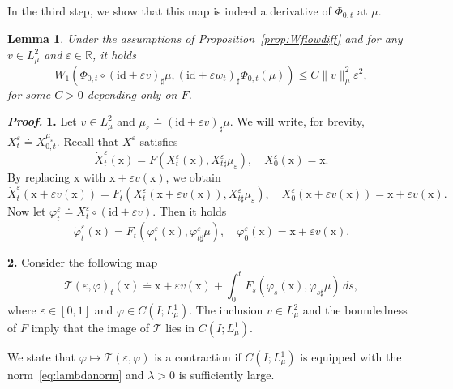 \documentclass[sn-mathphys-num]{sn-jnl}
\numberwithin{equation}{section}
\theoremstyle{mythm}
\newtheorem{lemma}[proposition]{Lemma}
\theoremstyle{mydef}
\renewenvironment{proof}{\smallskip\noindent\emph{\textbf{Proof.}}%
  \hspace{1pt}}{\hspace{-5pt}{\nobreak\quad\nobreak\hfill\nobreak%
    $\square$\vspace{2pt}\par}\smallskip\goodbreak}
\renewcommand{\epsilon}{\varepsilon}
\renewcommand{\phi}{\varphi}
\renewcommand{\d}{\,d}
\newcommand{\id}{\mathrm{id}}
\begin{document}
In the third step, we show that this map is indeed a derivative of \( \Phi_{0,t} \) at \( \mu \).

\begin{lemma}
  \label{lem:s2}
Under the assumptions of Proposition~\ref{prop:Wflowdiff} and for any \( v\in {L}^2_{\mu} \) and \( \varepsilon\in \mathbb{R} \), it holds
\[
W_1\left(\Phi_{0,t}\circ (\id + \varepsilon v)_{\sharp}\mu, (\id + \varepsilon w_t)_{\sharp} \Phi_{0,t}(\mu)\right) \le C\|v\|^2_{\mu}\varepsilon^2,
\]
for some \( C>0 \) depending only on \( F \).
\end{lemma}
\begin{proof}
  \textbf{1.} Let \( v\in {L}^2_{\mu} \) and \( \mu_{\varepsilon}\doteq(\id+\varepsilon v)_{\sharp}\mu\).
  We will write, for brevity, \( X^{\varepsilon}_t \doteq X^{\mu_{\varepsilon}}_{0,t} \).
Recall that \( X^\varepsilon \) satisfies
\[
  \dot X^{\varepsilon}_{t}(\mathrm{x}) = F(X^{\varepsilon}_{t}(\mathrm{x}),X^{\varepsilon}_{t\sharp}\mu_{\varepsilon}),\quad X^{\varepsilon}_{0}(\mathrm{x})=\mathrm{x}.
\]
By replacing \( \mathrm{x} \) with \( \mathrm{x}+\varepsilon v(\mathrm{x}) \), we obtain
\[
  \dot X^{\varepsilon}_t\left(\mathrm{x}+\varepsilon v(\mathrm{x})\right) = F_t\left(X^{\varepsilon}_t\left(\mathrm{x}+\varepsilon v(\mathrm{x})\right),X^{\varepsilon}_{t\sharp}\mu_{\varepsilon}\right),\quad X^{\varepsilon}_0\left(\mathrm{x}+\varepsilon v(\mathrm{x})\right)=\mathrm{x}+\varepsilon v(\mathrm{x}).
\]
Now let \( \varphi^{\varepsilon}_t \doteq X_t^{\varepsilon}\circ (\id + \varepsilon v) \).
Then it holds
\[
  \dot \varphi_t^{\varepsilon}(\mathrm{x}) = F_t\left(\phi_t^{\varepsilon}(\mathrm{x}), \phi_{t\sharp}^{\varepsilon}\mu\right), \quad \phi^{\varepsilon}_0(\mathrm{x}) = \mathrm{x} + \varepsilon v(\mathrm{x}).
\]

\textbf{2.} Consider the following map
\[
  \mathcal{T}(\varepsilon,\varphi)_t(\mathrm{x}) \doteq \mathrm{x} + \varepsilon v(\mathrm{x}) + \int_0^t F_s\left(\phi_s(\mathrm{x}),\phi_{s\sharp}\mu\right)\d s,
\]
where \( \epsilon\in [0,1] \) and \( \varphi \in C(I;{L}^1_{\mu}) \).
The inclusion \( v\in L^2_\mu \) and the boundedness of \( F \) imply that the image of \( \mathcal{T} \) lies in \( C(I;{L}^1_{\mu}) \).

We state that \( \varphi\mapsto \mathcal{T}(\varepsilon,\phi) \) is a contraction if \( C(I;{L}^1_{\mu}) \) is equipped with the norm~\eqref{eq:lambdanorm} and \( \lambda>0 \) is sufficiently large.


\end{proof}
\end{document}
